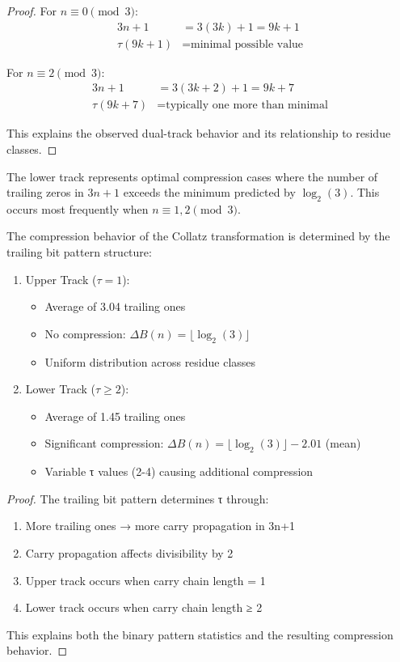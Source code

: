 \begin{proof}
For $n \equiv 0 \pmod{3}$:
\begin{align*}
3n + 1 &= 3(3k) + 1 = 9k + 1 \\
\tau(9k + 1) &= \text{minimal possible value}
\end{align*}

For $n \equiv 2 \pmod{3}$:
\begin{align*}
3n + 1 &= 3(3k + 2) + 1 = 9k + 7 \\
\tau(9k + 7) &= \text{typically one more than minimal}
\end{align*}

This explains the observed dual-track behavior and its relationship to residue classes.
\end{proof}

\begin{corollary}
The lower track represents optimal compression cases where the number of trailing zeros in $3n+1$ exceeds the minimum predicted by $\log_2(3)$. This occurs most frequently when $n \equiv 1,2 \pmod{3}$.
\end{corollary}

\begin{theorem}
The compression behavior of the Collatz transformation is determined by the trailing bit pattern structure:
\begin{enumerate}
\item Upper Track ($\tau = 1$):
   \begin{itemize}
   \item Average of 3.04 trailing ones
   \item No compression: $\Delta B(n) = \lfloor \log_2(3) \rfloor$
   \item Uniform distribution across residue classes
   \end{itemize}
\item Lower Track ($\tau \geq 2$):
   \begin{itemize}
   \item Average of 1.45 trailing ones
   \item Significant compression: $\Delta B(n) = \lfloor \log_2(3) \rfloor - 2.01$ (mean)
   \item Variable τ values (2-4) causing additional compression
   \end{itemize}
\end{enumerate}
\end{theorem}

\begin{proof}
The trailing bit pattern determines τ through:
\begin{enumerate}
\item More trailing ones → more carry propagation in 3n+1
\item Carry propagation affects divisibility by 2
\item Upper track occurs when carry chain length = 1
\item Lower track occurs when carry chain length ≥ 2
\end{enumerate}
This explains both the binary pattern statistics and the resulting compression behavior.
\end{proof} 